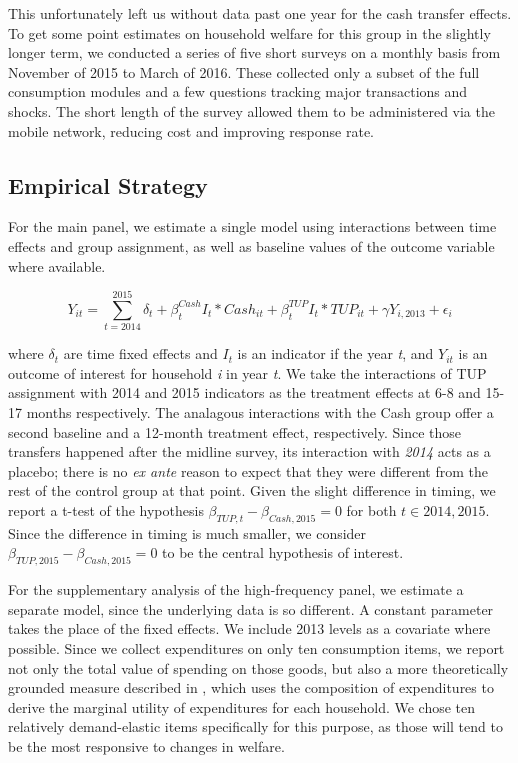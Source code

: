 \documentclass[12pt,article]{article}
\begin{document}
This unfortunately left us without data past one year for the cash transfer effects.
To get some point estimates on household welfare for this group in the slightly
longer term, we conducted a series of five short surveys on a monthly basis from
November of 2015 to March of 2016. These collected only a subset of the full
consumption modules and a few questions tracking major transactions and shocks. The
short length of the survey allowed them to be administered via the mobile network,
reducing cost and improving response rate.

\subsection*{Empirical Strategy}
\label{sec-2-2}

For the main panel, we estimate a single model using interactions between time effects and group
assignment, as well as baseline values of the outcome variable where available. 

\begin{equation*}
Y_{it} =\sum_{t=2014}^{2015}\delta_{t}+\beta_{t}^{Cash}I_{t}*Cash_{it}+\beta_{t}^{TUP}I_{t}*TUP_{it}+\gamma Y_{i,2013}+\epsilon_{i}
\end{equation*}

\noindent
where $\delta_{t}$ are time fixed effects and $I_{t}$ is an indicator if the year
\emph{t}, and $Y_{it}$ is an outcome of interest for household \emph{i} in year \emph{t}. We take
the interactions of TUP assignment with 2014 and 2015 indicators as the treatment
effects at 6-8 and 15-17 months respectively. The analagous interactions with the
Cash group offer a second baseline and a 12-month treatment effect, respectively.
Since those transfers happened after the midline survey, its interaction with \emph{2014}
acts as a placebo; there is no \emph{ex ante} reason to expect that they were different
from the rest of the control group at that point. Given the slight difference in
timing, we report a t-test of the hypothesis \(\beta_{TUP,t}-\beta_{Cash,2015}=0\) for
both \(t \in {2014,2015}\). Since the difference in timing is much smaller, we consider
\(\beta_{TUP,2015}-\beta_{Cash,2015}=0\) to be the central hypothesis of interest.

For the supplementary analysis of the high-frequency panel, we estimate a separate
model, since the underlying data is so different. A constant parameter takes the
place of the fixed effects. We include 2013 levels as a covariate where possible.
Since we collect expenditures on only ten consumption items, we report not only the
total value of spending on those goods, but also a more theoretically grounded
measure described in \cite{collins-ligon17}, which uses the composition of
expenditures to derive the marginal utility of expenditures for each household. We
chose ten relatively demand-elastic items specifically for this purpose, as those
will tend to be the most responsive to changes in welfare.
\end{document}
